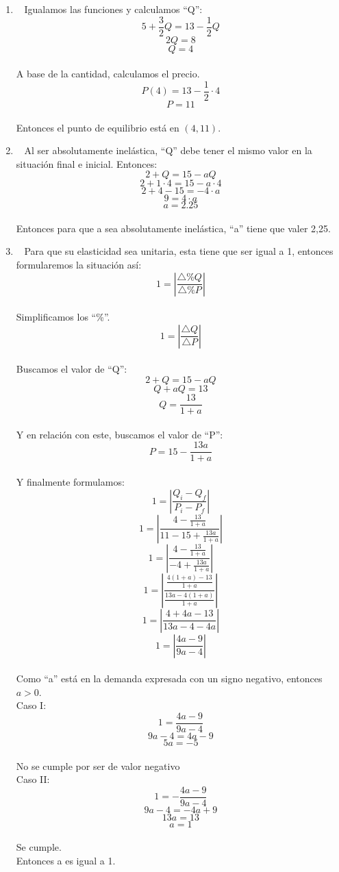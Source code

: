 \documentclass[
  letterpaper,
  DIV=11,
  numbers=noendperiod]{scrreport}
\begin{document}
\begin{enumerate}
\def\labelenumi{\alph{enumi})}
\item
  ~ Igualamos las funciones y calculamos ``Q'':
  \[5+\frac{3}{2}Q=13-\frac{1}{2}Q\] \[2Q=8\] \[Q=4\]\\
  \hspace*{0.333em} A base de la cantidad, calculamos el precio.
  \[P(4)=13-\frac{1}{2}\cdot4\] \[P=11\]\\
  \hspace*{0.333em} Entonces el punto de equilibrio está en
  \((4,11)\).\\
\item
  ~ Al ser absolutamente inelástica, ``Q'' debe tener el mismo valor en
  la situación final e inicial. Entonces: \[2+Q=15-aQ\]
  \[2+1\cdot 4 =15-a\cdot 4\] \[2+4-15=-4\cdot a\] \[9=4\cdot a\]
  \[a=2.25\]\\
  \hspace*{0.333em} Entonces para que a sea absolutamente inelástica,
  ``a'' tiene que valer 2,25.
\item
  ~ Para que su elasticidad sea unitaria, esta tiene que ser igual a 1,
  entonces formularemos la situación así:
  \[1 =\left|\frac{\triangle\%Q}{\triangle\%P}\right|\]\\
  \hspace*{0.333em} Simplificamos los ``\%''.
  \[1 =\left|\frac{\triangle Q}{\triangle P}\right|\]\\
  \hspace*{0.333em} Buscamos el valor de ``Q'': \[2+Q=15-aQ\]
  \[Q+aQ=13\] \[Q=\frac{13}{1+a}\]\\
  \hspace*{0.333em} Y en relación con este, buscamos el valor de ``P'':
  \[P=15-\frac{13a}{1+a}\]\\
  \hspace*{0.333em} Y finalmente formulamos:
  \[1 =\left|\frac{Q_i-Q_f}{P_i-P_f}\right|\]
  \[1 =\left|\frac{4-\frac{13}{1+a}}{11-15+\frac{13a}{1+a}}\right|\]
  \[1 =\left|\frac{4-\frac{13}{1+a}}{-4+\frac{13a}{1+a}}\right|\]
  \[1 =\left|\frac{\frac{4(1+a)-13}{1+a}}{\frac{13a-4(1+a)}{1+a}}\right|\]
  \[1 =\left|\frac{4+4a-13}{13a-4-4a}\right|\]
  \[1 =\left|\frac{4a-9}{9a-4}\right|\]\\
  \hspace*{0.333em} Como ``a'' está en la demanda expresada con un signo
  negativo, entonces \(a>0\).\\
  \hspace*{0.333em} Caso I: \[1 =\frac{4a-9}{9a-4}\] \[9a-4 =4a-9\]
  \[5a=-5\]\\
  \hspace*{0.333em} No se cumple por ser de valor negativo\\
  \hspace*{0.333em} Caso II: \[1 =-\frac{4a-9}{9a-4}\] \[9a-4 =-4a+9\]
  \[13a =13\] \[a =1\]\\
  \hspace*{0.333em} Se cumple.\\
  \hspace*{0.333em} Entonces a es igual a 1.
\end{enumerate}
\end{document}
